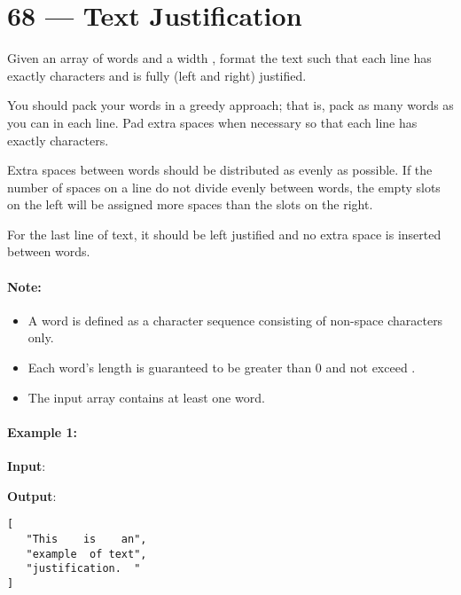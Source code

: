 \section{68 --- Text Justification}
Given an array of words and a width , format the text such that each line has exactly  characters and is fully (left and right) justified.

You should pack your words in a greedy approach; that is, pack as many words as you can in each line. Pad extra spaces  when necessary so that each line has exactly  characters.

Extra spaces between words should be distributed as evenly as possible. If the number of spaces on a line do not divide evenly between words, the empty slots on the left will be assigned more spaces than the slots on the right.

For the last line of text, it should be left justified and no extra space is inserted between words.

\paragraph{Note:}

\begin{itemize}
\item A word is defined as a character sequence consisting of non-space characters only.

\item Each word's length is guaranteed to be greater than 0 and not exceed .

\item The input array  contains at least one word.

\end{itemize}

\paragraph{Example 1:}
\begin{flushleft}


\textbf{Input}:



\textbf{Output}:

\begin{lstlisting}[style=customc]
[
   "This    is    an",
   "example  of text",
   "justification.  "
]
\end{lstlisting}
\end{flushleft}

